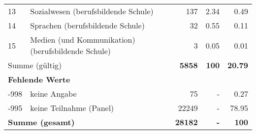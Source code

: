 \begin{longtable}{lXrrr}
     13 &
     \multicolumn{1}{X}{ Sozialwesen (berufsbildende Schule)   } &


       \num{137} &
       \num[round-mode=places,round-precision=2]{2,34} &
         \num[round-mode=places,round-precision=2]{0,49} \\

     14 &
     \multicolumn{1}{X}{ Sprachen (berufsbildende Schule)   } &


       \num{32} &
       \num[round-mode=places,round-precision=2]{0,55} &
         \num[round-mode=places,round-precision=2]{0,11} \\

     15 &
     \multicolumn{1}{X}{ Medien (und Kommunikation) (berufsbildende Schule)   } &


       \num{3} &
       \num[round-mode=places,round-precision=2]{0,05} &
         \num[round-mode=places,round-precision=2]{0,01} \\
     \midrule
     \multicolumn{2}{l}{Summe (gültig)} &
       \textbf{\num{5858}} &
     \textbf{100} &
       \textbf{\num[round-mode=places,round-precision=2]{20,79}} \\
     \multicolumn{5}{l}{\textbf{Fehlende Werte}}\\
       -998 &
       keine Angabe &
         \num{75} &
        - &
         \num[round-mode=places,round-precision=2]{0,27} \\
       -995 &
       keine Teilnahme (Panel) &
         \num{22249} &
        - &
         \num[round-mode=places,round-precision=2]{78,95} \\
     \midrule
     \multicolumn{2}{l}{\textbf{Summe (gesamt)}} &
          \textbf{\num{28182}} &
        \textbf{-} &
        \textbf{100} \\
     \bottomrule
     \end{longtable}
     
